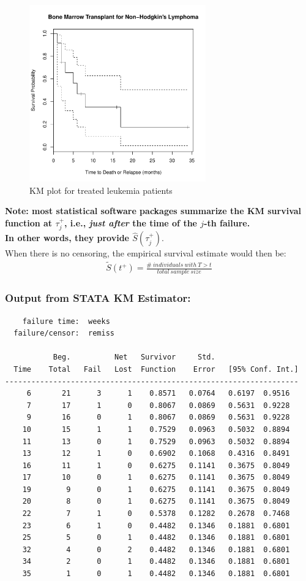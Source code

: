 \documentclass[11pt,slidesonly,semrot,portrait,palatino]{book}
\begin{document}
\begin{figure}[h]
\centerline{\includegraphics[width=3in]{surv_trt.pdf}}
\caption{KM plot for treated leukemia patients}
\end{figure}
\noindent
{\bf Note: most statistical software packages summarize
the KM survival function at $\tau_j^{+}$, i.e.,
{\em just after} the time of the $j$-th failure.}
\\[2ex]
{ \bf In other words, they provide $\hat{S}(\tau_j^+)$}.
\\[2ex]
When there is no censoring, the empirical survival estimate
would then be:
\begin{eqnarray*}
\tilde{S}(t^+) = \frac{\#~individuals~ with~T > t}{total~sample~size}
\end{eqnarray*}
\newpage
\subsubsection{Output from STATA KM Estimator:}
\small
\begin{verbatim}
    failure time:  weeks
  failure/censor:  remiss

           Beg.          Net   Survivor     Std.
  Time    Total   Fail   Lost  Function    Error   [95% Conf. Int.]
-------------------------------------------------------------------
     6       21      3      1    0.8571   0.0764   0.6197  0.9516
     7       17      1      0    0.8067   0.0869   0.5631  0.9228
     9       16      0      1    0.8067   0.0869   0.5631  0.9228
    10       15      1      1    0.7529   0.0963   0.5032  0.8894
    11       13      0      1    0.7529   0.0963   0.5032  0.8894
    13       12      1      0    0.6902   0.1068   0.4316  0.8491
    16       11      1      0    0.6275   0.1141   0.3675  0.8049
    17       10      0      1    0.6275   0.1141   0.3675  0.8049
    19        9      0      1    0.6275   0.1141   0.3675  0.8049
    20        8      0      1    0.6275   0.1141   0.3675  0.8049
    22        7      1      0    0.5378   0.1282   0.2678  0.7468
    23        6      1      0    0.4482   0.1346   0.1881  0.6801
    25        5      0      1    0.4482   0.1346   0.1881  0.6801
    32        4      0      2    0.4482   0.1346   0.1881  0.6801
    34        2      0      1    0.4482   0.1346   0.1881  0.6801
    35        1      0      1    0.4482   0.1346   0.1881  0.6801
\end{verbatim}
\normalsize
\newpage
\end{document}
